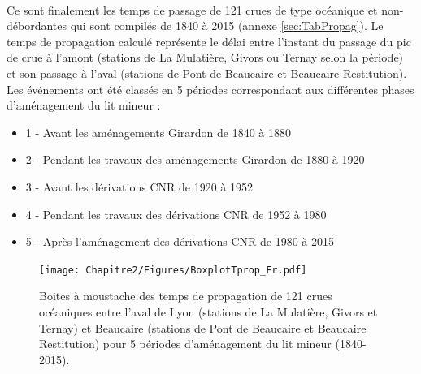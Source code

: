 	\paragraph{} Ce sont finalement les temps de passage de 121 crues de type océanique et non-débordantes qui sont compilés de 1840 à 2015 (annexe \ref{sec:TabPropag}). Le temps de propagation calculé représente le délai entre l'instant du passage du pic de crue à l'amont (stations de La Mulatière, Givors ou Ternay selon la période) et son passage à l'aval (stations de Pont de Beaucaire et Beaucaire Restitution). Les événements ont été classés en 5 périodes correspondant aux différentes phases d'aménagement du lit mineur : 
	\begin{itemize}
		\item 1 - Avant les aménagements Girardon de 1840 à 1880
		\item 2 - Pendant les travaux des aménagements Girardon de 1880 à 1920
		\item 3 - Avant les dérivations CNR de 1920 à 1952
		\item 4 - Pendant les travaux des dérivations CNR de 1952 à 1980
		\item 5 - Après l'aménagement des dérivations CNR de 1980 à 2015
	\end{itemize}

	\begin{figure}[h!]
		\centering
			\texttt{[image: Chapitre2/Figures/BoxplotTprop\_Fr.pdf]}
	        \caption{Boites à moustache des temps de propagation de 121 crues océaniques entre l'aval de Lyon (stations de La Mulatière, Givors et Ternay) et Beaucaire (stations de Pont de Beaucaire et Beaucaire Restitution) pour 5 périodes d'aménagement du lit mineur (1840-2015).}
			\label{fig:BoxplotPropag}
		\end{figure}	

